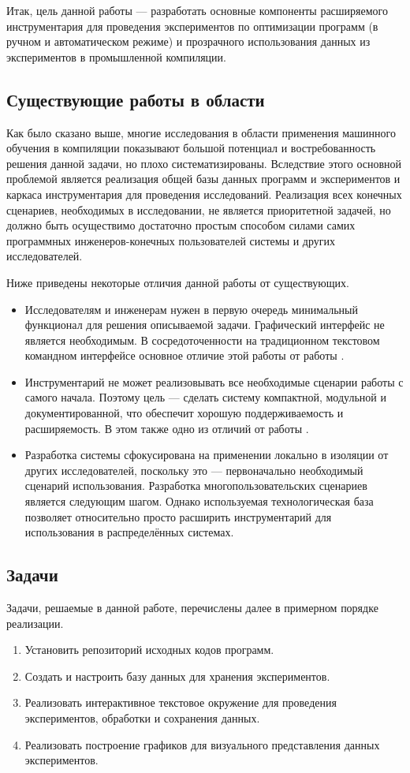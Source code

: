 Итак, цель данной работы --- разработать основные компоненты расширяемого инструментария для проведения экспериментов по оптимизации программ (в ручном и автоматическом режиме) и прозрачного использования данных из экспериментов в промышленной компиляции.

\subsection{Существующие работы в области}
Как было сказано выше, многие исследования в области применения машинного обучения в компиляции \cite{Dubach2009PCO,Thomson2009RTT,Stephenson2003MOI} показывают большой потенциал и востребованность решения данной задачи, но плохо систематизированы. Вследствие этого основной проблемой является реализация общей базы данных программ и экспериментов и каркаса инструментария для проведения исследований. Реализация всех конечных сценариев, необходимых в исследовании, не является приоритетной задачей, но должно быть осуществимо достаточно простым способом силами самих программных инженеров-конечных пользователей системы и других исследователей.

Ниже приведены некоторые отличия данной работы от существующих.
\begin{itemize}
    \item Исследователям и инженерам нужен в первую очередь минимальный функционал для решения описываемой задачи. Графический интерфейс не является необходимым. В сосредоточенности на традиционном текстовом командном интерфейсе основное отличие этой работы от работы \cite{Fursin2010COP}.
    \item Инструментарий не может реализовывать все необходимые сценарии работы с самого начала. Поэтому цель --- сделать систему компактной, модульной и документированной, что обеспечит хорошую поддерживаемость и расширяемость. В этом также одно из отличий от работы \cite{Fursin2010COP}.
    \item Разработка системы сфокусирована на применении локально в изоляции от других исследователей, поскольку это --- первоначально необходимый сценарий использования. Разработка многопользовательских сценариев является следующим шагом. Однако используемая технологическая база позволяет относительно просто расширить инструментарий для использования в распределённых системах.
\end{itemize}

\subsection{Задачи}
Задачи, решаемые в данной работе, перечислены далее в примерном порядке реализации.
\begin{enumerate}
    \item Установить репозиторий исходных кодов программ.
    \item Создать и настроить базу данных для хранения экспериментов.
    \item Реализовать интерактивное текстовое окружение для проведения экспериментов, обработки и сохранения данных.
    \item Реализовать построение графиков для визуального представления данных экспериментов.
\end{enumerate}
